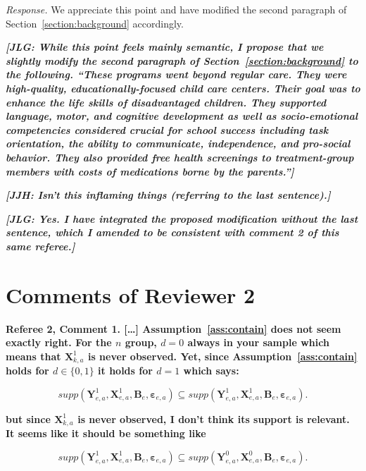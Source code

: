 \noindent \textit{Response.} We appreciate this point and have modified the second paragraph of Section~\ref{section:background} accordingly.

\textit{\textbf{[JLG: While this point feels mainly semantic, I propose that we slightly modify the second paragraph of Section~\ref{section:background} to the following. ``These programs went beyond regular care. They were high-quality, educationally-focused child care centers. Their goal was to enhance the life skills of disadvantaged children. They supported language, motor, and cognitive development as well as socio-emotional competencies considered crucial for school success including task orientation, the ability to communicate, independence, and pro-social behavior. They also provided free health screenings to treatment-group members with costs of medications borne by the parents.'']}}

\textit{\textbf{[JJH: Isn't this inflaming things (referring to the last sentence).]}}

\textit{\textbf{[JLG: Yes. I have integrated the proposed modification without the last sentence, which I amended to be consistent with comment 2 of this same referee.]}}


\section*{Comments of Reviewer 2}

\noindent \textbf{Referee 2, Comment 1. [\ldots] Assumption~\ref{ass:contain} does not seem exactly right. For the $n$ group, $d = 0$ always in your sample which means that $\bm{X}_{k,a}^1$ is never observed. Yet, since Assumption~\ref{ass:contain} holds for $d \in \{ 0,1 \}$ it holds for $d = 1$ which says:} 

\begin{equation}
supp( \bm{Y}_{e,a}^1, \bm{X}^1_{e,a}, \bm{B}_e, \bm{\varepsilon}_{e,a} ) \subseteq supp( \bm{Y}_{e,a}^1, \bm{X}^1_{e,a}, \bm{B}_e, \bm{\varepsilon}_{e,a} ). \label{eq:ref1}
\end{equation}

\textbf{but since $\bm{X}_{k,a}^1$ is never observed, I don't think its support is relevant. It seems like it should be something like} 

\begin{equation}
supp( \bm{Y}_{e,a}^1, \bm{X}^1_{e,a}, \bm{B}_e, \bm{\varepsilon}_{e,a} ) \subseteq supp( \bm{Y}_{e,a}^0, \bm{X}^0_{e,a}, \bm{B}_e, \bm{\varepsilon}_{e,a} ).  \label{eq:ref2}
\end{equation}

